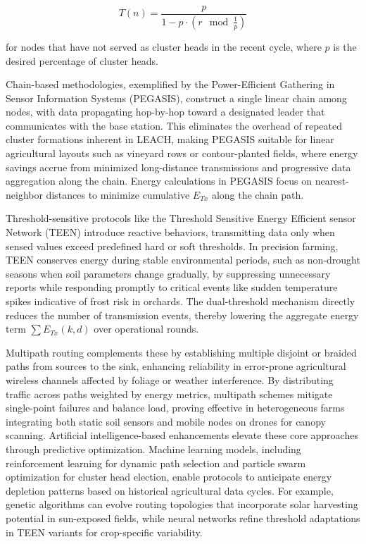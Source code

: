 \documentclass[12pt]{article}
\begin{document}
\begin{equation}
T(n) = \frac{p}{1 - p \cdot (r \mod \frac{1}{p})}
\end{equation}

for nodes that have not served as cluster heads in the recent cycle, where \( p \) is the desired percentage of cluster heads.

Chain-based methodologies, exemplified by the Power-Efficient Gathering in Sensor Information Systems (PEGASIS), construct a single linear chain among nodes, with data propagating hop-by-hop toward a designated leader that communicates with the base station. This eliminates the overhead of repeated cluster formations inherent in LEACH, making PEGASIS suitable for linear agricultural layouts such as vineyard rows or contour-planted fields, where energy savings accrue from minimized long-distance transmissions and progressive data aggregation along the chain. Energy calculations in PEGASIS focus on nearest-neighbor distances to minimize cumulative \( E_{Tx} \) along the chain path.

Threshold-sensitive protocols like the Threshold Sensitive Energy Efficient sensor Network (TEEN) introduce reactive behaviors, transmitting data only when sensed values exceed predefined hard or soft thresholds. In precision farming, TEEN conserves energy during stable environmental periods, such as non-drought seasons when soil parameters change gradually, by suppressing unnecessary reports while responding promptly to critical events like sudden temperature spikes indicative of frost risk in orchards. The dual-threshold mechanism directly reduces the number of transmission events, thereby lowering the aggregate energy term \( \sum E_{Tx}(k, d) \) over operational rounds.

Multipath routing complements these by establishing multiple disjoint or braided paths from sources to the sink, enhancing reliability in error-prone agricultural wireless channels affected by foliage or weather interference. By distributing traffic across paths weighted by energy metrics, multipath schemes mitigate single-point failures and balance load, proving effective in heterogeneous farms integrating both static soil sensors and mobile nodes on drones for canopy scanning. Artificial intelligence-based enhancements elevate these core approaches through predictive optimization. Machine learning models, including reinforcement learning for dynamic path selection and particle swarm optimization for cluster head election, enable protocols to anticipate energy depletion patterns based on historical agricultural data cycles. For example, genetic algorithms can evolve routing topologies that incorporate solar harvesting potential in sun-exposed fields, while neural networks refine threshold adaptations in TEEN variants for crop-specific variability.
\end{document}
